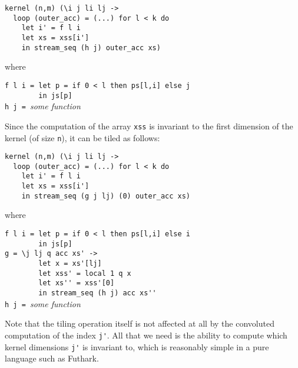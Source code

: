 \begin{lstlisting}
kernel (n,m) (\i j li lj ->
  loop (outer_acc) = (...) for l < k do
    let i' = f l i
    let xs = xss[i']
    in stream_seq (h j) outer_acc xs)
\end{lstlisting}
\begin{minipage}[t]{0.1\linewidth}
  \begin{flushright}
    where
  \end{flushright}
\end{minipage}
\begin{minipage}[t]{0.8\linewidth}
\lstinline{f l i = let p = if 0 < l then ps[l,i] else j}\\
\lstinline{        in js[p]}\\
\lstinline{h j = }\textit{some function}
\end{minipage}
\vspace{1em}

Since the computation of the array \texttt{xss} is invariant to the
first dimension of the kernel (of size \texttt{n}), it can be tiled as
follows:

\begin{lstlisting}
kernel (n,m) (\i j li lj ->
  loop (outer_acc) = (...) for l < k do
    let i' = f l i
    let xs = xss[i']
    in stream_seq (g j lj) (0) outer_acc xs)
\end{lstlisting}
\begin{minipage}[t]{0.1\linewidth}
  \begin{flushright}
    where
  \end{flushright}
\end{minipage}
\begin{minipage}[t]{0.8\linewidth}
\lstinline{f l i = let p = if 0 < l then ps[l,i] else i}\\
\lstinline{        in js[p]}\\
\lstinline{g = \j lj q acc xs' ->}\\
\lstinline{        let x = xs'[lj]}\\
\lstinline{        let xss' = local 1 q x}\\
\lstinline{        let xs'' = xss'[0]}\\
\lstinline{        in stream_seq (h j) acc xs''}\\
\lstinline{h j = }\textit{some function}
\end{minipage}
\vspace{1em}

Note that the tiling operation itself is not affected at all by the
convoluted computation of the index \lstinline{j'}.  All that we need
is the ability to compute which kernel dimensions \lstinline{j'} is
invariant to, which is reasonably simple in a pure language such as
Futhark.

